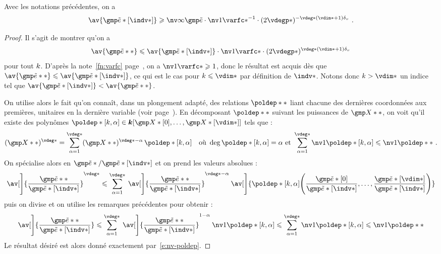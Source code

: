 \begin{lem} \label{l:coord-norm}
  Avec les notations précédentes, on a
  \begin{equation}
    \av{ \cexa*[\indv*] }
    \ge
    \nv\infty{ \cexa }
    \cdot \nv1{ \varfc* }^{-1}
    \cdot ( 2 \vdegp* )^{- \vdeg* (\vdim* + 1) \dv}
    \pmm.
  \end{equation}
\end{lem}

\begin{proof}
  Il s'agit de montrer qu'on a
  \begin{equation}
    \av{ \cexa** }
    \le
    \av{ \cexa*[\indv*] }
    \cdot \nv1{ \varfc* }
    \cdot ( 2 \vdegp* )^{\vdeg* (\vdim* + 1) \dv}
  \end{equation}
  pour tout \( k \). D'après la note~\vref{fn:varfc}
  page~\pageref{fn:varfc}, on a \( \nv1{ \varfc* } \ge 1 \), donc le résultat
  est acquis dès que \( \av{ \cexa** } \le \av{ \cexa*[\indv*] } \), ce qui
  est le cas pour \( \ind \le \vdim* \) par définition de \( \indv* \). Notons
  donc \( \ind > \vdim* \) un indice tel que \( \av{ \cexa*[\indv*] } < \av{
      \cexa** } \).

  On utilise alors le fait qu'on connaît, dans un plongement adapté, des
  relations \( \poldep** \) liant chacune des dernières coordonnées aux
  premières,  unitaires en la dernière variable (voir
  page~\pageref{p:def-poldep}). En décomposant \( \poldep**
  \) suivant les puissances de \( \vmp** \), on voit qu'il existe des
  polynômes \( \poldep*[\ind, \alpha] \in \cdn[ \vmp*[0], \dots, \vmp*[\vdim*]
    ] \) tels que :
  \begin{equation}
    (\vmp**) ^{ \vdeg* }
    =
    \sum_{ \alpha=1 }^{ \vdeg* }
    (\vmp**) ^{ \vdeg* - \alpha }
    \, \poldep*[\ind, \alpha]
    \quad\text{où }
    \deg \poldep*[\ind, \alpha] = \alpha
    \text{ et }
    \sum_{ \alpha=1 }^{ \vdeg* } \nv1{ \poldep*[\ind, \alpha] }
    \le \nv1{ \poldep** }
    \pmm.
  \end{equation}
  On spécialise alors en \( \cexa* / \cexa*[\indv*] \) et on prend les valeurs
  absolues :
  \begin{equation}
    \av[\Bigg]{ \frac{ \cexa** }{ \cexa*[\indv*] } }^{ \vdeg* }
    \le
    \sum_{ \alpha=1 }^{ \vdeg* }
    \: \av[\Bigg]{ \frac{ \cexa** }{ \cexa*[\indv*] } }^{ \vdeg* - \alpha }
    \: \av[\Bigg]{
      \poldep*[\ind, \alpha] \Biggl(
        \frac{ \cexa*[0] }{ \cexa*[\indv*] }, \dots,
        \frac{ \cexa*[\vdim*] }{ \cexa*[\indv*] }
      \Biggr)
    }
  \end{equation}
  puis on divise et on utilise les remarques précédentes pour obtenir :
  \begin{align}
    \av[\Bigg]{ \frac{ \cexa** }{ \cexa*[\indv*] } }
    \le
    \sum_{ \alpha=1 }^{ \vdeg* }
    \: \av[\Bigg]{ \frac{ \cexa** }{ \cexa*[\indv*] } }^{ 1 - \alpha }
    \: \nv1{ \poldep*[\ind, \alpha] }
    \le
    \sum_{ \alpha=1 }^{ \vdeg* }
    \nv1{ \poldep*[\ind, \alpha] }
    \le
    \nv1{ \poldep** }
  \end{align}
  Le résultat désiré est alors donné exactement par~\eqref{e:nv-poldep}.
\end{proof}

